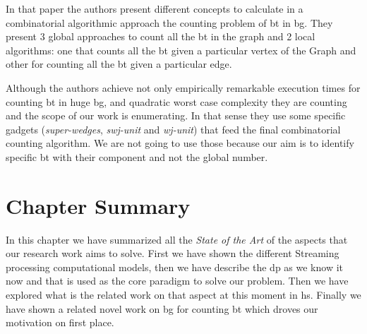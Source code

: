 In that paper the authors present different concepts to calculate in a combinatorial algorithmic approach the counting problem of \acrshort{bt} in \acrshort{bg}. They present 3 global approaches to count
all the \acrshort{bt} in the graph and 2 local algorithms: one that counts all the \acrshort{bt} given a particular vertex of the Graph and other for counting all the \acrshort{bt} given a particular edge.

Although the authors achieve not only empirically remarkable execution times for counting \acrshort{bt} in huge \acrshort{bg}, and quadratic worst case complexity they are counting and the scope of our work
is enumerating. In that sense they use some specific gadgets (\emph{super-wedges}, \emph{swj-unit} and \emph{wj-unit}) that feed the final combinatorial counting algorithm. We are not going to use those because our 
aim is to identify specific \acrshort{bt} with their component and not the global number.

\section{Chapter Summary}
In this chapter we have summarized all the \emph{State of the Art} of the aspects that our research work aims to solve.
First we have shown the different Streaming processing computational models, then we have describe the \acrshort{dp} as we know it now and that is used 
as the core paradigm to solve our problem. Then we have explored what is the related work on that aspect at this moment in \acrshort{hs}. Finally we have shown 
a related novel work on \acrlong{bg} for counting \acrlong{bt} which droves our motivation on first place.
